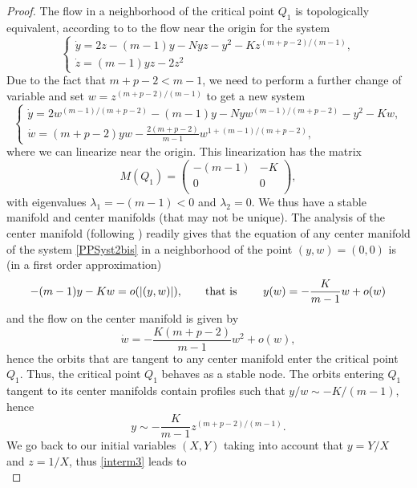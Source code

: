 \documentclass[a4paper,11pt]{article}
\numberwithin{equation}{section}
\begin{document}
\begin{proof}
The flow in a neighborhood of the critical point $Q_1$ is topologically equivalent, according to \cite[Theorem 2, Section 3.10]{Pe} to the flow near the origin for the system
\begin{equation}\label{PPSyst2}
\left\{\begin{array}{ll}\dot{y}=2z-(m-1)y-Nyz-y^2-Kz^{(m+p-2)/(m-1)}, \\ \dot{z}=(m-1)yz-2z^2\end{array}\right.
\end{equation}
Due to the fact that $m+p-2<m-1$, we need to perform a further change of variable and set $w=z^{(m+p-2)/(m-1)}$ to get a new system
\begin{equation}\label{PPSyst2bis}
\left\{\begin{array}{ll}\dot{y}=2w^{(m-1)/(m+p-2)}-(m-1)y-Nyw^{(m-1)/(m+p-2)}-y^2-Kw, \\ \dot{w}=(m+p-2)yw-\frac{2(m+p-2)}{m-1}w^{1+(m-1)/(m+p-2)},\end{array}\right.
\end{equation}
where we can linearize near the origin. This linearization has the matrix
$$M(Q_1)=\left(
  \begin{array}{cc}
    -(m-1) & -K \\
    0 & 0 \\
  \end{array}
\right),$$
with eigenvalues $\lambda_1=-(m-1)<0$ and $\lambda_2=0$. We thus have a stable manifold and center manifolds (that may not be unique). The analysis of the center manifold (following \cite[Section 2.12]{Pe}) readily gives that the equation of any center manifold of the system \eqref{PPSyst2bis} in a neighborhood of the point $(y,w)=(0,0)$ is (in a first order approximation)
$$
-(m-1)y-Kw=o(|(y,w)|), \qquad {\rm that \ is } \ \qquad y(w)=-\frac{K}{m-1}w+o(w)
$$
and the flow on the center manifold is given by
$$
\dot{w}=-\frac{K(m+p-2)}{m-1}w^2+o(w),
$$
hence the orbits that are tangent to any center manifold enter the critical point $Q_1$. Thus, the critical point $Q_1$ behaves as a stable node. The orbits entering $Q_1$ tangent to its center manifolds contain profiles such that $y/w\sim-K/(m-1)$, hence
\begin{equation}\label{interm3}
y\sim-\frac{K}{m-1}z^{(m+p-2)/(m-1)}.
\end{equation}
We go back to our initial variables $(X,Y)$ taking into account that $y=Y/X$ and $z=1/X$, thus \eqref{interm3} leads to
\begin{equation}\label{interm.new}

\end{equation}
\end{proof}
\end{document}
